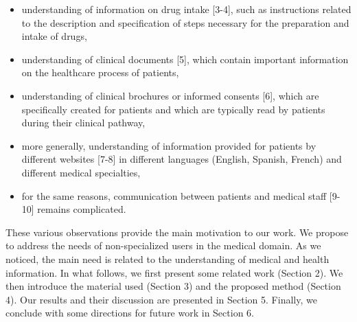 \begin{itemize}
    \item  understanding of information on drug intake [3-4], such as instructions related to the description and specification of steps necessary for the preparation and intake of drugs,
    
    \item  understanding of clinical documents [5], which contain important information on the healthcare process of patients,
    
    \item  understanding of clinical brochures or informed consents [6], which are specifically created for patients and which are typically read by patients during their clinical pathway,
    
    \item  more generally, understanding of information provided for patients by different websites [7-8] in different languages (English, Spanish, French) and different medical specialties,
    
    \item  for the same reasons, communication between patients and medical staff [9-10] remains complicated.
\end{itemize}

These various observations provide the main motivation to our work. We propose to address the needs of non-specialized users in the medical domain. As we noticed, the main need is related to the understanding of medical and health information. In what follows, we first present some related work (Section 2). We then introduce the material used (Section 3) and the proposed method (Section 4). Our results and their discussion are presented in Section 5. Finally, we conclude with some directions for future work in Section 6.
